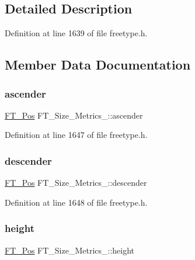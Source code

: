 \subsection{Detailed Description}


Definition at line 1639 of file freetype.\+h.



\subsection{Member Data Documentation}
\mbox{\label{struct_f_t___size___metrics___ab5fde60a2661d7b774f61c264a2a6070}} 
\subsubsection{\texorpdfstring{ascender}{ascender}}
{\footnotesize\ttfamily \mbox{\hyperlink{ftimage_8h_af5f230f4b253d4c7715fd2e595614c90}{F\+T\+\_\+\+Pos}} F\+T\+\_\+\+Size\+\_\+\+Metrics\+\_\+\+::ascender}



Definition at line 1647 of file freetype.\+h.

\mbox{\label{struct_f_t___size___metrics___a9b2ca3a4391803e8721ed99eb9953d52}} 
\subsubsection{\texorpdfstring{descender}{descender}}
{\footnotesize\ttfamily \mbox{\hyperlink{ftimage_8h_af5f230f4b253d4c7715fd2e595614c90}{F\+T\+\_\+\+Pos}} F\+T\+\_\+\+Size\+\_\+\+Metrics\+\_\+\+::descender}



Definition at line 1648 of file freetype.\+h.

\mbox{\label{struct_f_t___size___metrics___ae3361e264fb8a9e669f118bdb244439b}} 
\subsubsection{\texorpdfstring{height}{height}}
{\footnotesize\ttfamily \mbox{\hyperlink{ftimage_8h_af5f230f4b253d4c7715fd2e595614c90}{F\+T\+\_\+\+Pos}} F\+T\+\_\+\+Size\+\_\+\+Metrics\+\_\+\+::height}



